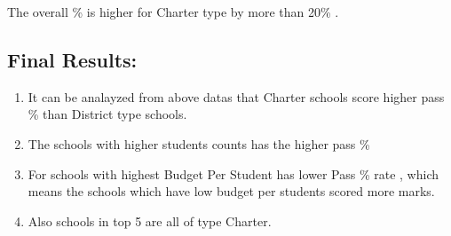 \documentclass[11pt]{article}
\begin{document}
    The overall \% is higher for Charter type by more than 20\% .

    \subsection{Final Results:}\label{final-results}


\begin{enumerate}  
	\item It can be analayzed from above datas that Charter schools score higher pass \% than District type schools.  
	\item The schools with higher students counts has the higher pass \%
	\item For schools with highest Budget Per Student has lower Pass \% rate , which means the schools which have low    budget per students scored more marks.
	\item Also schools in top 5 are all of type Charter.
\end{enumerate}




    
    
    
    
\end{document}
